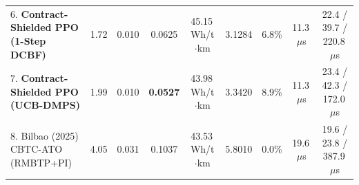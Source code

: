 \documentclass[10pt,a4paper]{article}
\begin{document}
\begin{table}[H]
{\begin{tabular}{lcccccccc}
6. \textbf{Contract-Shielded PPO (1-Step DCBF)} & 1.72  & 0.010 & 0.0625 & 45.15\,Wh/t$\cdot$km & 3.1284  & 6.8\%  & 11.3\,$\mu$s & 22.4 / 39.7 / 220.8\,$\mu$s \\
7. \textbf{Contract-Shielded PPO (UCB-DMPS)}    & 1.99  & 0.010 & \textbf{0.0527} & 43.98\,Wh/t$\cdot$km & 3.3420  & 8.9\%  & 11.3\,$\mu$s & 23.4 / 42.3 / 172.0\,$\mu$s \\
8. Bilbao (2025) CBTC-ATO (RMBTP+PI)   & 4.05  & 0.031 & 0.1037 & 43.53\,Wh/t$\cdot$km & 5.8010  & 0.0\%  & 19.6\,$\mu$s & 19.6 / 23.8 / 387.9\,$\mu$s \\
\bottomrule
\end{tabular}%
}
\end{table}

\begin{table}[H]
\centering
\caption{Aggregated Hierarchical Differential and Contract Shield Diagnostics Across All 30 Generalized Multi-Station Scenarios ($430.9\text{ km}$ Total Distance, $69,745$ Micro-Steps, Overall Emu-to-Real $\text{RMSE} = 0.0205\text{ m/s}$, Empirical 99th-Percentile Error $= 0.0559\text{ m/s}$, Physical Tube Containment $= 99.96\%$).}
\label{tab:scissor_diag}
\end{table}
\end{document}
